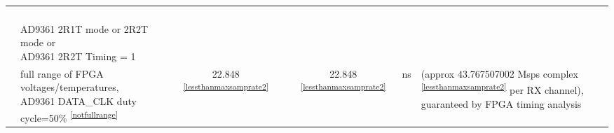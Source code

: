 \documentclass{article}
\begin{document}
\begin{scriptsize}
\begin{longtable}{|c|l|c|c|c|c|l|}
                          &                                      &                                & &                                &                      & \\
                          &                                      &                                & &                                &                      & \\
                          &                                      &                                & &                                &                      & \\
                          &                                      &                                & &                                &                      & \\
                          & \multirow{2}{*}{\parbox{6.7 cm}{\hspace*{12mm}AD9361 2R1T mode or 2R2T mode or \\ \hspace*{12mm}AD9361 2R2T Timing = 1}} & & & & & \\
                          &                                      &                                & &                                &                      & \\
                          & \multirow{5}{*}{\parbox{6.7cm}{\hspace*{15mm}full range of FPGA voltages/temperatures,\\ \hspace*{15mm}AD9361 DATA\_CLK duty cycle=50\% \textsuperscript{\ref{notfullrange}} }} & \multirow{5}{*}{22.848 \textsuperscript{\ref{lessthanmaxsamprate2}}}  & & \multirow{5}{*}{22.848 \textsuperscript{\ref{lessthanmaxsamprate2}}} & \multirow{5}{*}{ns} & \multirow{5}{*}{\parbox{3.0cm}{(approx 43.767507002 Msps complex \textsuperscript{\ref{lessthanmaxsamprate2}} per RX channel), \\ guaranteed by FPGA timing analysis}} \\
                          &                                      &                                & &                                &                      & \\
                          &                                      &                                & &                                &                      & \\
                          &                                      &                                & &                                &                      & \\

\end{longtable}
\end{scriptsize}
\end{document}
